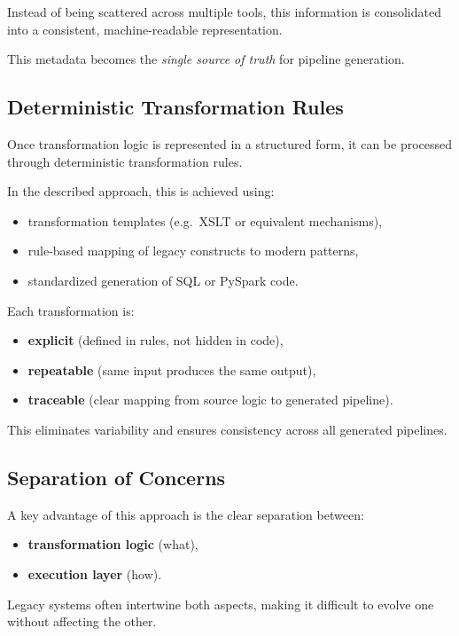 \documentclass[11pt,a4paper]{article}
\begin{document}
Instead of being scattered across multiple tools, this information is consolidated into a consistent, machine-readable representation.

This metadata becomes the \emph{single source of truth} for pipeline generation.

\subsection{Deterministic Transformation Rules}

Once transformation logic is represented in a structured form, it can be processed through deterministic transformation rules.

In the described approach, this is achieved using:
\begin{itemize}
  \item transformation templates (e.g.\ XSLT or equivalent mechanisms),
  \item rule-based mapping of legacy constructs to modern patterns,
  \item standardized generation of SQL or PySpark code.
\end{itemize}

Each transformation is:
\begin{itemize}
  \item \textbf{explicit} (defined in rules, not hidden in code),
  \item \textbf{repeatable} (same input produces the same output),
  \item \textbf{traceable} (clear mapping from source logic to generated pipeline).
\end{itemize}

This eliminates variability and ensures consistency across all generated pipelines.

\subsection{Separation of Concerns}

A key advantage of this approach is the clear separation between:
\begin{itemize}
  \item \textbf{transformation logic} (what),
  \item \textbf{execution layer} (how).
\end{itemize}

Legacy systems often intertwine both aspects, making it difficult to evolve one without affecting the other.
\end{document}

